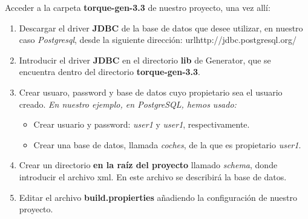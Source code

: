 Acceder a la carpeta {\bf torque-gen-3.3} de nuestro proyecto, una vez allí:

\begin{enumerate}
	\item Descargar el driver {\bf JDBC} de la base de datos que desee utilizar, en nuestro caso {\em Postgresql}, desde la siguiente dirección: url{http://jdbc.postgresql.org/}
	\item Introducir el driver {\bf JDBC} en el directorio {\bf lib} de Generator, que se encuentra dentro del directorio {\bf torque-gen-3.3}.

	\item Crear usuaro, password y base de datos cuyo propietario sea el usuario creado. {\em En nuestro ejemplo, en PostgreSQL, hemos usado:}
	\begin{itemize}
		\item Crear usuario y password: {\em user1} y {\em user1}, respectivamente. 
		\item Crear una base de datos, llamada {\em coches}, de la que es propietario {\em user1}.
	\end{itemize}
	
	\item Crear un directorio {\bf en la raíz del proyecto} llamado {\em schema}, donde introducir el archivo xml. En este archivo se describirá la base de datos.
	
	\item Editar el archivo {\bf build.propierties} añadiendo la configuración de nuestro proyecto.
\end{enumerate}